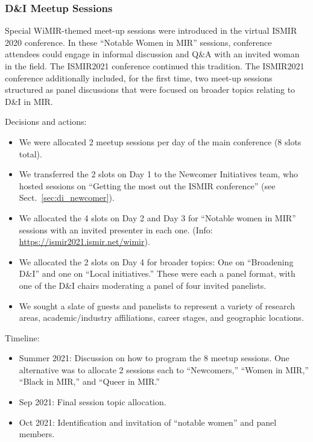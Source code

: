 \documentclass[%
10pt,								%
titlepage,						%
]
{scrartcl}
\begin{document}
        \subsubsection{D\&I Meetup Sessions}\label{sec:di_meetup}
            Special WiMIR-themed meet-up sessions were introduced in the virtual ISMIR 2020 conference. In these ``Notable Women in MIR'' sessions, conference attendees could engage in informal discussion and Q\&A with an invited woman in the field. The ISMIR2021 conference continued this tradition. The ISMIR2021 conference additionally included, for the first time, two meet-up sessions structured as panel discussions that were focused on broader topics relating to D\&I in MIR.
            
                Decisions and actions:
                \begin{itemize}
                    \item   We were allocated 2 meetup sessions per day of the main conference (8 slots total).
                    \item   We transferred the 2 slots on Day 1 to the Newcomer Initiatives team, who hosted sessions on ``Getting the most out the ISMIR conference'' (see Sect.~\ref{sec:di_newcomer}).
                    \item   We allocated the 4 slots on Day 2 and Day 3 for ``Notable women in MIR'' sessions with an invited presenter in each one. (Info: \href{https://ismir2021.ismir.net/wimir}{https://ismir2021.ismir.net/wimir}).
                    \item   We allocated the 2 slots on Day 4 for broader topics: One on ``Broadening D\&I'' and one on ``Local initiatives.'' These were each a panel format, with one of the D\&I chairs moderating a panel of four invited panelists.
                    \item   We sought a slate of guests and panelists to represent a variety of research areas, academic/industry affiliations, career stages, and geographic locations.
                \end{itemize}

                Timeline:
                \begin{itemize}
                    \item   Summer 2021: Discussion on how to program the 8 meetup sessions. One alternative was to allocate 2 sessions each to ``Newcomers,'' ``Women in MIR,'' ``Black in MIR,'' and ``Queer in MIR.''
                    \item   Sep 2021: Final session topic allocation.
                    \item   Oct 2021: Identification and invitation of ``notable women'' and panel members.
                \end{itemize}
\end{document}
